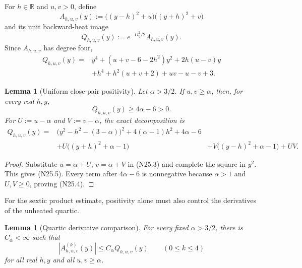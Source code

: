 \documentclass[11pt]{article}
\newtheorem{lemma}[theorem]{Lemma}
\theoremstyle{definition}
\theoremstyle{remark}
\begin{document}
For \(h\in\mathbb R\) and \(u,v>0\), define
\[
 A_{h,u,v}(y)
 :=\bigl((y-h)^2+u\bigr)\bigl((y+h)^2+v\bigr)
 \tag{N25.1}
\]
and its unit backward-heat image
\[
 Q_{h,u,v}(y):=e^{-D_y^2/2}A_{h,u,v}(y).
 \tag{N25.2}
\]
Since \(A_{h,u,v}\) has degree four,
\[
\begin{aligned}
 Q_{h,u,v}(y)
={}&y^4+(u+v-6-2h^2)y^2+2h(u-v)y\\
 &+h^4+h^2(u+v+2)+uv-u-v+3.
\end{aligned}
\tag{N25.3}
\]

\begin{lemma}[Uniform close-pair positivity]
\label{lem:f2v25-quartic-positive}
Let \(\alpha>3/2\).  If \(u,v\geq\alpha\), then, for every real \(h,y\),
\[
 Q_{h,u,v}(y)\geq4\alpha-6>0.
 \tag{N25.4}
\]
For \(U:=u-\alpha\) and \(V:=v-\alpha\), the exact decomposition is
\[
\begin{aligned}
 Q_{h,u,v}(y)
={}&\bigl(y^2-h^2-(3-\alpha)\bigr)^2
+4(\alpha-1)h^2+4\alpha-6\\
&+U\bigl((y+h)^2+\alpha-1\bigr)
&+V\bigl((y-h)^2+\alpha-1\bigr)+UV.
\end{aligned}
\tag{N25.5}
\]
\end{lemma}

\begin{proof}
Substitute \(u=\alpha+U\), \(v=\alpha+V\) in
\textup{(N25.3)} and complete the square in \(y^2\).  This gives
\textup{(N25.5)}.  Every term after \(4\alpha-6\) is nonnegative because
\(\alpha>1\) and \(U,V\geq0\), proving \textup{(N25.4)}.
\end{proof}

For the sextic product estimate, positivity alone must also control the
derivatives of the unheated quartic.

\begin{lemma}[Quartic derivative comparison]
\label{lem:f2v25-derivative-comparison}
For every fixed \(\alpha>3/2\), there is \(C_\alpha<\infty\) such that
\[
 |A_{h,u,v}^{(k)}(y)|\leq
 C_\alpha Q_{h,u,v}(y)
 \qquad(0\leq k\leq4)
 \tag{N25.6}
\]
for all real \(h,y\) and all \(u,v\geq\alpha\).
\end{lemma}
\end{document}
